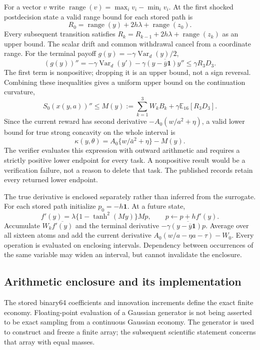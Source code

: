 \documentclass[ecta,nameyear,draft]{econsocart}
\theoremstyle{definition}
\theoremstyle{remark}
\newcommand{\E}{\mathbb E}
\begin{document}
For a vector $v$ write $\operatorname{range}(v)=\max_i v_i-\min_i v_i$.
At the first shocked postdecision state a valid range bound for each stored
path is
\[
 R_0=\operatorname{range}(y)+2h\lambda+
                       \operatorname{range}(z_0).
\]
Every subsequent transition satisfies
$R_k=R_{k-1}+2h\lambda+\operatorname{range}(z_k)$ as an upper bound.
The scalar drift and common withdrawal cancel from a coordinate range.
For the terminal payoff $g(y)=-\gamma\operatorname{Var}_d(y)/2$,
\[
 (g(y))''=-\gamma\operatorname{Var}_d(y')
 -\gamma\overline{(y-\overline y\bm1)y''}
 \leq\gamma R_3D_3.
\]
The first term is nonpositive; dropping it is an upper bound, not a sign
reversal. Combining these inequalities gives a uniform upper bound on the
continuation curvature,
\[
 S_0(x(y,a))''\leq
 M(y):=\sum_{k=1}^{3}W_kB_k+\gamma\E_{16}[R_3D_3].
\]
Since the current reward has second derivative
$-A_0(w/a^2+\eta)$, a valid lower bound for true strong concavity on the
whole interval is
\begin{equation}
 \kappa(y,\theta)=A_0\{w/\bar a^2+\eta\}-M(y).
 \label{eq:r19kappa}
\end{equation}
The verifier evaluates this expression with outward arithmetic and requires
a strictly positive lower endpoint for every task. A nonpositive result
would be a verification failure, not a reason to delete that task. The
published records retain every returned lower endpoint.

The true derivative is enclosed separately rather than inferred from the
surrogate. For each stored path initialize $p_0=-h\bm1$. At a future state,
\[
 f'(y)=\lambda\{1-\tanh^2(My)\}Mp,\qquad
 p\leftarrow p+h f'(y).
\]
Accumulate $W_k\overline{f'(y)}$ and the terminal derivative
$-\gamma\overline{(y-\overline y\bm1)p}$. Average over all sixteen atoms
and add the current derivative
$A_0(w/a-\eta a-\tau)-W_0$. Every operation is evaluated on enclosing
intervals. Dependency between occurrences of the same variable may widen
an interval, but cannot invalidate the enclosure.

\subsection{Arithmetic enclosure and its implementation}
The stored binary64 coefficients and innovation increments define the exact
finite economy. Floating-point evaluation of a Gaussian generator is not
being asserted to be exact sampling from a continuous Gaussian economy.
The generator is used to construct and freeze a finite array; the subsequent
scientific statement concerns that array with equal masses.
\end{document}
